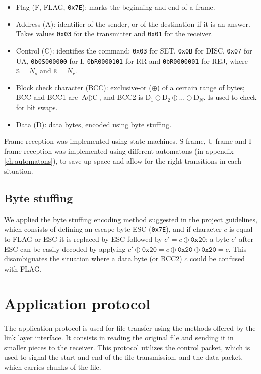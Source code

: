 \documentclass[a4paper, 11pt]{report}
\newcommand*\xor{\oplus}
\begin{document}
\begin{itemize}
	\itemsep0em
	\item Flag (F, FLAG, \texttt{0x7E}): marks the beginning and end of a frame.
	\item Address (A): identifier of the sender, or of the destination if it is an answer. Takes values \texttt{0x03} for the transmitter and \texttt{0x01} for the receiver.
	\item Control (C): identifies the command; \texttt{0x03} for SET, \texttt{0x0B} for DISC, \texttt{0x07} for UA, \texttt{0b0S000000} for I, \texttt{0bR0000101} for RR and \texttt{0bR0000001} for REJ, where $\texttt{S} = N_s$ and $\texttt{R} = N_r$.
	\item Block check character (BCC): exclusive-or ($\xor$) of a certain range of bytes; BCC and BCC1 are $\text{A}\xor\text{C}$, and BCC2 is $\text{D}_1 \xor \text{D}_2 \xor ... \xor \text{D}_N$. Is used to check for bit swaps.
	\item Data (D): data bytes, encoded using byte stuffing.
\end{itemize}

Frame reception was implemented using state machines. S-frame, U-frame and I-frame reception was implemented using different automatons (in appendix \ref{ch:automatons}), to save up space and allow for the right transitions in each situation.


\subsection{Byte stuffing}

We applied the byte stuffing encoding method suggested in the project guidelines, which consists of defining an escape byte ESC (\texttt{0x7E}), and if character $c$ is equal to FLAG or ESC it is replaced by ESC followed by $c' = c \xor \texttt{0x20}$; a byte $c'$ after ESC can be easily decoded by applying $c' \xor \texttt{0x20} = c \xor \texttt{0x20} \xor \texttt{0x20} = c$. This disambiguates the situation where a data byte (or BCC2) $c$ could be confused with FLAG.

\section{Application protocol} \label{sec:AppProtocol}

The application protocol is used for file transfer using the methods offered by the link layer interface. It consists in reading the original file and sending it in smaller pieces to the receiver. This protocol utilizes the control packet, which is used to signal the start and end of the file transmission, and the data packet, which carries chunks of the file.
\end{document}
